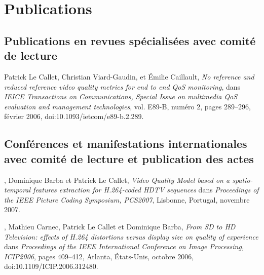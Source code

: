

\chapter*{Publications}

\section*{Publications en revues spécialisées avec comité de lecture}
\noindent Patrick Le Callet, Christian Viard-Gaudin,  et Émilie Caillault, \emph{No reference and reduced reference video quality metrics for end to end QoS monitoring}, dans \emph{IEICE Transactions on Communications, Special Issue on multimedia QoS evaluation and management technologies}, vol. E89-B, numéro 2, pages 289--296, février 2006, doi:10.1093/ietcom/e89-b.2.289.


\section*{Conférences et manifestations internationales avec comité de lecture et publication des actes}
\noindent {}, Dominique Barba et Patrick Le Callet, \emph{Video Quality Model based on a spatio-temporal features extraction for H.264-coded HDTV sequences} dans \emph{Proceedings of the IEEE Picture Coding Symposium, PCS2007}, Lisbonne, Portugal, novembre 2007.

\bigskip

\noindent {}, Mathieu Carnec, Patrick Le Callet et Dominique Barba, \emph{From SD to HD Television: effects of H.264 distortions versus display size on quality of experience} dans \emph{Proceedings of the IEEE International Conference on Image Processing, ICIP2006}, pages 409--412, Atlanta, États-Unis, octobre 2006, doi:10.1109/ICIP.2006.312480.

